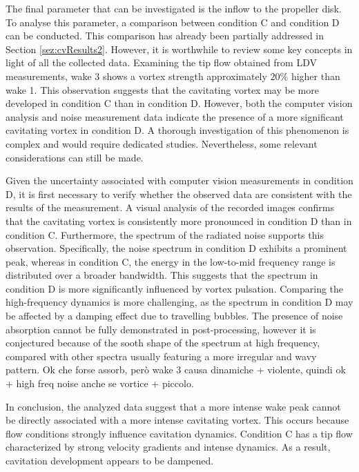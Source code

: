 The final parameter that can be investigated is the inflow to the propeller disk. To analyse this parameter, a comparison between condition C and condition D can be conducted.
This comparison has already been partially addressed in Section \ref{sez:cvResults2}. However, it is worthwhile to review some key concepts in light of all the collected data.
Examining the tip flow obtained from LDV measurements, wake 3 shows a vortex strength approximately $20 \%$ higher than wake 1. This observation suggests that the cavitating vortex may be more developed in condition C than in condition D. However, both the computer vision analysis and noise measurement data indicate the presence of a more significant cavitating vortex in condition D.
A thorough investigation of this phenomenon is complex and would require dedicated studies. Nevertheless, some relevant considerations can still be made.

Given the uncertainty associated with computer vision measurements in condition D, it is first necessary to verify whether the observed data are consistent with the results of the measurement. A visual analysis of the recorded images confirms that the cavitating vortex is consistently more pronounced in condition D than in condition C.
Furthermore, the spectrum of the radiated noise supports this observation. Specifically, the noise spectrum in condition D exhibits a prominent peak, whereas in condition C, the energy in the low-to-mid frequency range is distributed over a broader bandwidth. This suggests that the spectrum in condition D is more significantly influenced by vortex pulsation.
Comparing the high-frequency dynamics is more challenging, as the spectrum in condition D may be affected by a damping effect due to travelling bubbles. The presence of noise absorption cannot be fully demonstrated in post-processing, however it is conjectured because of the sooth shape of the spectrum at high frequency, compared with other spectra usually featuring a more irregular and wavy pattern.
Ok che forse assorb, però wake 3 causa dinamiche + violente, quindi ok + high freq noise anche se vortice + piccolo.

In conclusion, the analyzed data suggest that a more intense wake peak cannot be directly associated with a more intense cavitating vortex. 
This occurs because flow conditions strongly influence cavitation dynamics. Condition C has a tip flow characterized by strong velocity gradients and intense dynamics. As a result, cavitation development appears to be dampened.

